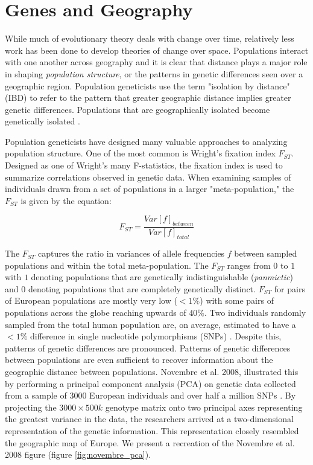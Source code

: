 \section{Genes and Geography}
While much of evolutionary theory deals with change over time, relatively less work has been done to develop theories of change over space. Populations interact with one another across geography and it is clear that distance plays a major role in shaping \textit{population structure}, or the patterns in genetic differences seen over a geographic region. Population geneticists use the term "isolation by distance" (IBD) to refer to the pattern that greater geographic distance implies greater genetic differences. Populations that are geographically isolated become genetically isolated \cite{rohlf_investigation_1971} \cite{slatkin_isolation_1993}. 


Population geneticists have designed many valuable approaches to analyzing population structure. One of the most common is Wright's fixation index $F_{ST}$. Designed as one of Wright's many F-statistics, the fixation index is used to summarize correlations observed in genetic data. When examining samples of individuals drawn from a set of populations in a larger "meta-population," the $F_{ST}$ is given by the equation:

\begin{equation}
    F_{ST} = \frac{Var[f]_{between}}{Var[f]_{total}}
\end{equation}

The $F_{ST}$ captures the ratio in variances of allele frequencies $f$ between sampled populations and within the total meta-population. The $F_{ST}$ ranges from $0$ to $1$ with $1$ denoting populations that are genetically indistinguishable (\textit{panmictic}) and $0$ denoting populations that are completely genetically distinct. $F_{ST}$ for pairs of European populations are mostly very low ($ < 1\%$) \cite{lin_comparison_1994} with some pairs of populations across the globe reaching upwards of $40\%$. Two individuals randomly sampled from the total human population are, on average, estimated to have a $ < 1\%$ difference in single nucleotide polymorphisms (SNPs) \cite{1k_genomes}. Despite this, patterns of genetic differences are pronounced. Patterns of genetic differences between populations are even sufficient to recover information about the geographic distance between populations. Novembre et al. 2008, illustrated this by performing a principal component analysis (PCA) on genetic data collected from a sample of $3000$ European individuals and over half a million SNPs \cite{novembre_genes_2008}. By projecting the $3000 \times 500k$ genotype matrix onto two principal axes representing the greatest variance in the data, the researchers arrived at a two-dimensional representation of the genetic information. This representation closely resembled the geographic map of Europe. We present a recreation of the Novembre et al. 2008 figure (figure \ref{fig:novembre_pca}).


